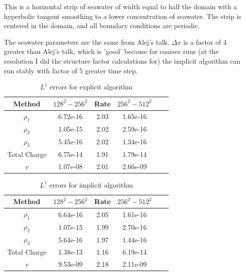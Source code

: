 \documentclass[final]{siamltex}
\begin{document}
This is a horizontal strip of seawater of width equal to half the domain
with a hyperbolic tangent smoothing to a lower concentration of seawater.
The strip is centered in the domain, and all boundary conditions are periodic.

The seawater parameters are the same from Alej's talk.  $\Delta x$ is a factor
of 4 greater than Alej's talk, which is 'good' because for coarser runs
(at the resolution I did the structure factor calculations for) the implicit
algorithm can run stably with factor of 5 greater time step.

\begin{table}
\begin{center}
\caption{$L^1$ errors for explicit algorithm}
\label{tab:explicit convergence}
\begin{tabular}{cccccc}
\\ \hline\hline                                                                 
Method & $128^2-256^2$ & Rate & $256^2-512^2$ \\
\hline\hline
$\rho_1$     & 6.72e-16 & 2.03 & 1.65e-16 \\
$\rho_2$     & 1.05e-15 & 2.02 & 2.59e-16 \\
$\rho_3$     & 5.45e-16 & 2.02 & 1.34e-16 \\
Total Charge & 6.75e-14 & 1.91 & 1.79e-14 \\
$v$          & 1.07e-08 & 2.01 & 2.66e-09 \\
\end{tabular}
\end{center}
\end{table}

\begin{table}
\begin{center}
\caption{$L^1$ errors for implicit algorithm}
\label{tab:implicit convergence}
\begin{tabular}{cccccc}
\\ \hline\hline                                                                 
Method & $128^2-256^2$ & Rate & $256^2-512^2$ \\
\hline\hline
$\rho_1$     & 6.64e-16 & 2.05 & 1.61e-16 \\
$\rho_2$     & 1.07e-15 & 1.99 & 2.70e-16 \\
$\rho_3$     & 5.64e-16 & 1.97 & 1.44e-16 \\
Total Charge & 1.38e-13 & 1.16 & 6.19e-14 \\
$v$          & 9.53e-09 & 2.18 & 2.11e-09 \\
\end{tabular}
\end{center}
\end{table}
\end{document}
